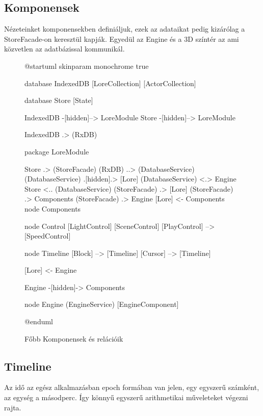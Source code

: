 \subsection{Komponensek}

Nézeteinket komponensekben definiáljuk, ezek az adataikat pedig kizárólag a StoreFacade-on keresztül kapják. Egyedül az Engine és a 3D színtér az ami közvetlen az adatbázissal kommunikál.

\begin{figure}[h!]
	\centering
	\begin{plantuml}
		@startuml
		skinparam monochrome true

		database IndexedDB {
			[LoreCollection]
			[ActorCollection]
		}

		database Store {
			[State]
		}

		IndexedDB -[hidden]--> LoreModule
		Store -[hidden]--> LoreModule

		IndexedDB .> (RxDB)


		package LoreModule {
			Store .> (StoreFacade)
			(RxDB) ..> (DatabaseService)
			(DatabaseService) .[hidden].> [Lore]
			(DatabaseService) <.> Engine
			Store <.. (DatabaseService)
			(StoreFacade) .> [Lore]
			(StoreFacade) .> Components
			(StoreFacade) .> Engine
			[Lore] <- Components
			node Components {

				node Control {
					[LightControl]
					[SceneControl]
					[PlayControl] --> [SpeedControl]
				}


				node Timeline {
					[Block] --> [Timeline]
					[Cursor] --> [Timeline]
				}
			}

			[Lore] <- Engine

			Engine -[hidden]-> Components

			node Engine {
				(EngineService)
				[EngineComponent]
			}


		}


		@enduml
	\end{plantuml}
	\caption{Főbb Komponensek és relációik}
	\label{fig:services-and-components}
\end{figure}

\subsection{Timeline}

Az idő az egész alkalmazásban epoch \cite{Epoch} formában van jelen, egy egyszerű számként, az egység a másodperc. Így könnyű egyszerű arithmetikai műveleteket végezni rajta.

